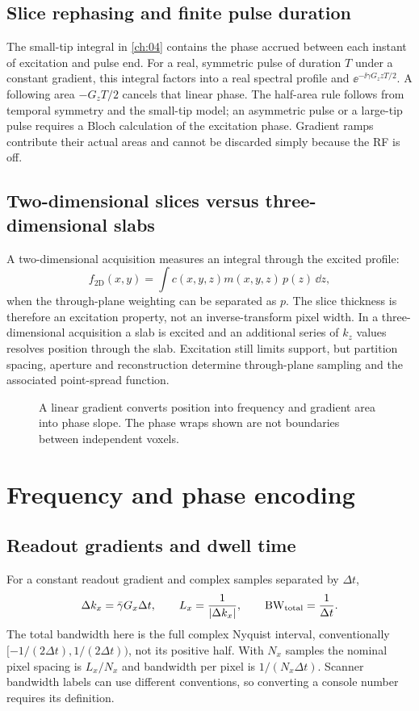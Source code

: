 \subsection{Slice rephasing and finite pulse duration}
The small-tip integral in \cref{ch:04} contains the phase accrued between each instant of excitation and pulse end. For a real, symmetric pulse of duration \(T\) under a constant gradient, this integral factors into a real spectral profile and
\(\ee^{-\ii\gamma G_z zT/2}\). A following area \(-G_zT/2\) cancels that linear phase. The half-area rule follows from temporal symmetry and the small-tip model; an asymmetric pulse or a large-tip pulse requires a Bloch calculation of the excitation phase. Gradient ramps contribute their actual areas and cannot be discarded simply because the RF is off.

\subsection{Two-dimensional slices versus three-dimensional slabs}
A two-dimensional acquisition measures an integral through the excited profile:
\[
 f_{\mathrm{2D}}(x,y)=\int c(x,y,z)m(x,y,z)\,p(z)\,\dd z,
\]
when the through-plane weighting can be separated as \(p\).
The slice thickness is therefore an excitation property, not an inverse-transform pixel width. In a three-dimensional acquisition a slab is excited and an additional series of \(k_z\) values resolves position through the slab. Excitation still limits support, but partition spacing, aperture and reconstruction determine through-plane sampling and the associated point-spread function.

\begin{figure}[tb]
\centering

\caption{A linear gradient converts position into frequency and gradient area into phase slope. The phase wraps shown are not boundaries between independent voxels.}
\label{fig:05:encoding}
\end{figure}

\section{Frequency and phase encoding}
\label{sec:05:frequency-and-phase-encoding}
\subsection{Readout gradients and dwell time}
For a constant readout gradient and complex samples separated by \(\Delta t\),
\begin{equation}
 \Delta k_x=\bar{\gamma} G_x\Delta t,\qquad
 L_x=\frac{1}{|\Delta k_x|},\qquad
 \mathrm{BW}_{\mathrm{total}}=\frac{1}{\Delta t}.
 \label{eq:05:readout}
\end{equation}
The total bandwidth here is the full complex Nyquist interval, conventionally
\([-1/(2\Delta t),1/(2\Delta t))\), not its positive half. With \(N_x\) samples the nominal pixel spacing is \(L_x/N_x\) and bandwidth per pixel is \(1/(N_x\Delta t)\). Scanner bandwidth labels can use different conventions, so converting a console number requires its definition.

